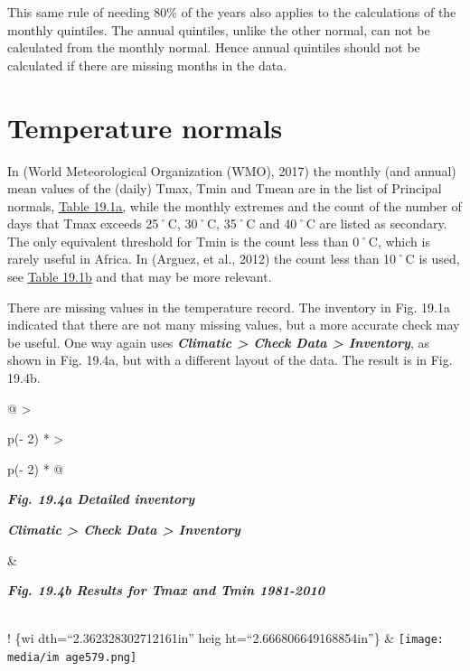 \documentclass[
  letterpaper,
  DIV=11,
  numbers=noendperiod]{scrreprt}
\begin{document}
This same rule of needing 80\% of the years also applies to the
calculations of the monthly quintiles. The annual quintiles, unlike the
other normal, can not be calculated from the monthly normal. Hence
annual quintiles should not be calculated if there are missing months in
the data.

\section{Temperature normals}\label{temperature-normals}

In (World Meteorological Organization (WMO), 2017) the monthly (and
annual) mean values of the (daily) Tmax, Tmin and Tmean are in the list
of Principal normals, \hyperref[bookmark=id.4anzqyu]{\ul{Table 19.1a}},
while the monthly extremes and the count of the number of days that Tmax
exceeds 25˚C, 30˚C, 35˚C and 40˚C are listed as secondary. The only
equivalent threshold for Tmin is the count less than 0˚C, which is
rarely useful in Africa. In (Arguez, et al., 2012) the count less than
10˚C is used, see \hyperref[bookmark=id.2pta16n]{\ul{Table 19.1b}} and
that may be more relevant.

There are missing values in the temperature record. The inventory in
Fig. 19.1a indicated that there are not many missing values, but a more
accurate check may be useful. One way again uses \textbf{\emph{Climatic
\textgreater{} Check Data \textgreater{} Inventory}}, as shown in Fig.
19.4a, but with a different layout of the data. The result is in Fig.
19.4b.

\begin{longtable}[]{@{}
  >{\raggedright\arraybackslash}p{(\columnwidth - 2\tabcolsep) * }
  >{\raggedright\arraybackslash}p{(\columnwidth - 2\tabcolsep) * }@{}}
\toprule\noalign{}
\begin{minipage}[b]{\linewidth}\raggedright
\textbf{\emph{Fig. 19.4a Detailed inventory}}

\textbf{\emph{Climatic \textgreater{} Check Data \textgreater{}
Inventory}}
\end{minipage} & \begin{minipage}[b]{\linewidth}\raggedright
\textbf{\emph{Fig. 19.4b Results for Tmax and Tmin 1981-2010}}
\end{minipage} \\
\midrule\noalign{}
\endhead
\bottomrule\noalign{}
\endlastfoot
! \href{media/image576.png}{}\{wi dth=``2.362328302712161in'' heig
ht=``2.666806649168854in''\} &
\texttt{[image: media/im age579.png]} \\
\end{longtable}
\end{document}
